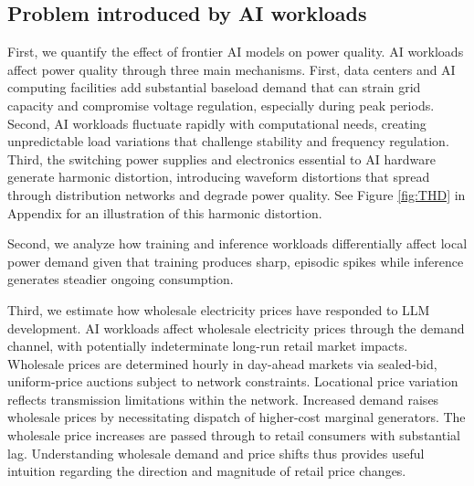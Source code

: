 \documentclass[a4paper,fleqn,longmktitle]{cas-sc}
\theoremstyle{plain}
\theoremstyle{definition}
\begin{document}
\subsection{Problem introduced by AI workloads }


First, we quantify the effect of frontier AI models on power quality. %
AI workloads affect power quality through three main mechanisms. First, data centers and AI computing facilities add substantial baseload demand that can strain grid capacity and compromise voltage regulation, especially during peak periods. Second, AI workloads fluctuate rapidly with computational needs, creating unpredictable load variations that challenge stability and frequency regulation. Third, the switching power supplies and electronics essential to AI hardware generate harmonic distortion, introducing waveform distortions that spread through distribution networks and degrade power quality. See Figure \ref{fig:THD} in Appendix for an illustration of this harmonic distortion.



Second, we analyze how training and inference workloads differentially affect local power demand given that training produces sharp, episodic spikes while inference generates steadier ongoing consumption. 

Third, we estimate how wholesale electricity prices have responded to LLM development. %
AI workloads  affect wholesale electricity prices through the demand channel, with potentially indeterminate long-run retail market impacts. %
Wholesale prices are determined hourly in day-ahead markets via sealed-bid, uniform-price auctions subject to network constraints. Locational price variation reflects transmission limitations within the network. Increased demand raises wholesale prices by necessitating dispatch of higher-cost marginal generators. The wholesale price increases are passed through to retail consumers with substantial lag. Understanding wholesale demand and price shifts thus provides useful intuition regarding the direction and magnitude of retail price changes.
\end{document}
